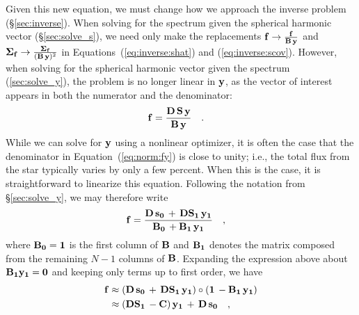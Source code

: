 \documentclass[modern]{aastex631}
\begin{document}
Given this new equation, we must change how we approach the inverse problem (\S\ref{sec:inverse}). 
When solving for the spectrum given the spherical harmonic vector (\S\ref{sec:solve_s}), we need only make the replacements ${\mathbf{f}} \rightarrow \frac{{\mathbf{f}}}{{\mathbf{B}}\, {\mathbf{y}}}$ and $\boldsymbol{\Sigma}_\mathbf{f} \rightarrow \frac{\boldsymbol{\Sigma}_\mathbf{f}}{({\mathbf{B}}\, {\mathbf{y}})^2}$ in Equations~(\ref{eq:inverse:shat}) and (\ref{eq:inverse:scov}).
However, when solving for the spherical harmonic vector given the spectrum (\ref{sec:solve_y}), the problem is no longer linear in ${\mathbf{y}}$, as the vector of interest appears in both the numerator and the denominator:
%
\begin{align}
    \label{eq:norm:fy}
    {\ensuremath{\mathbf{f}}}
     & =
    \frac{
        {\mathbf{D}}
        \,
        {\mathbf{S}}
        \,
        {\mathbf{y}}
    }{
        {\mathbf{B}}
        \,
        {\mathbf{y}}
    }
    \quad.
\end{align}
%
While we can solve for ${\mathbf{y}}$ using a nonlinear optimizer, it is often the case that the denominator in Equation~(\ref{eq:norm:fy}) is close to unity; i.e., the total flux from the star typically varies by only a few percent. 
When this is the case, it is straightforward to linearize this equation.
Following the notation from \S\ref{sec:solve_y}, we may therefore write
%
\begin{align}
    {\ensuremath{\mathbf{f}}}
     & =
    \frac{
        {\mathbf{D}} \, {\mathbf{s_0}}
        \,
        +
        \,
        {\mathbf{D}}{\mathbf{S_1}}
        \,
        {\mathbf{y_1}}
    }{
        {\mathbf{B_0}}
        \,
        +
        {\mathbf{B_1}}
        \,
        {\mathbf{y_1}}
    }
    \quad,
\end{align}
%
where ${\mathbf{B_0}} = {\mathbf{1}}$ is the first column of ${\mathbf{B}}$ and ${\mathbf{B}}_{\mathbf{1}}$ denotes the matrix composed from the remaining $N - 1$ columns of ${\mathbf{B}}$.
Expanding the expression above about ${\mathbf{B_1}} {\mathbf{y_1}} = {\mathbf{0}}$ and keeping only terms up to first order, we have
%
\begin{align}
    \label{eq:norm:fapprox}
    {\ensuremath{\mathbf{f}}}
     & \approx
    \left(
    {\mathbf{D}} \, {\mathbf{s_0}}
    \,
    +
    \,
    {\mathbf{D}}{\mathbf{S_1}}
    \,
    {\mathbf{y_1}}
    \right)
    \circ
    \left(
    {\mathbf{1}}
    \,
    -
    {\mathbf{B_1}}
    \,
    {\mathbf{y_1}}
    \right)
    \nonumber  \\
     & \approx
    \left(
    {\mathbf{D}}{\mathbf{S_1}}
    \,
    -
    {\mathbf{C}}
    \right)
    {\mathbf{y_1}}
    \,
    +
    \,
    {\mathbf{D}} \, {\mathbf{s_0}}
    \quad,
\end{align}
\end{document}
